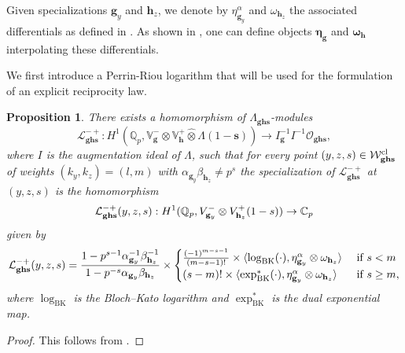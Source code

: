 \documentclass[a4paper,11pt]{amsart}
\theoremstyle{plain}
\newtheorem{propo}[theorem]{Proposition}
\theoremstyle{definition}
\theoremstyle{remark}
\newcommand{\bb}{\mathbb}
\newcommand{\cl}{\mathcal}
\DeclareMathOperator{\BK}{BK}
\DeclareMathOperator{\cyc}{cyc}
\newcommand{\hg}{{\mathbf{g}}}
\newcommand{\hh}{{\mathbf h}}
\numberwithin{equation}{section}
\begin{document}
Given specializations $\hg_y$ and $\hh_z$, we denote by $\eta_{\hg_y}^\alpha$ and $\omega_{\hh_z}$ the associated differentials as defined in \cite[\S3]{KLZ}. As shown in \cite[\S10]{KLZ}, %
one can define objects $\bm{\eta}_{\hg}$ and $\bm{\omega}_{\hh}$ interpolating these differentials.


We first introduce a Perrin-Riou logarithm that will be used for the formulation of an explicit reciprocity law. 


\begin{propo}\label{perrin1}
There exists a
homomorphism of $\Lambda_{\hg \hh \mathbf{s}}$-modules
\[
\mathcal L_{\hg \hh \mathbf{s}}^{-+}: H^1(\mathbb Q_p, \mathbb V_{\hg}^- \hat \otimes \mathbb V_{\hh}^+ \hat \otimes \Lambda(1-\mathbf{s})) \rightarrow  I_{\hg}^{-1} I^{-1}\cl{O}_{\hg \hh \mathbf{s}},
\]
where $I$ is the augmentation ideal of $\Lambda$, such that for every point $(y,z,s) \in \mathcal W_{{\bf ghs}}^{\mathrm{cl}}$ of weights $(k_y,k_z)=(l,m)$ with $\alpha_{\hg_y}\beta_{\hh_z}\neq p^s$ the specialization of $\mathcal L_{\hg \hh \mathbf{s}}^{-+}$ at $(y,z,s)$ is the homomorphism
\[
\mathcal L_{{\bf ghs}}^{-+}(y,z,s): H^1(\mathbb Q_p, V_{\hg_y}^- \otimes V_{\hh_z}^+(1-s)) \rightarrow \mathbb C_p
\]
given by
\[
\mathcal L_{{\bf ghs}}^{-+}(y,z,s) = \frac{1-p^{s-1} \alpha_{\hg_y}^{-1} \beta_{\hh_z}^{-1}}{1-p^{-s} \alpha_{\hg_y} \beta_{\hh_z}} \times \begin{cases} \frac{(-1)^{m-s-1}}{(m-s-1)!} \times \langle \log_{\BK}(\cdot), \eta_{\hg_y}^\alpha \otimes \omega_{\hh_z} \rangle & \text{ if } s < m \\ (s-m)! \times \langle \exp_{\BK}^*(\cdot), \eta_{\hg_y}^\alpha \otimes \omega_{\hh_z} \rangle & \text{ if } s \geq m, \end{cases}
\]
where $\log_{\BK}$ is the Bloch--Kato logarithm and $\exp_{\BK}^*$ is the dual exponential map.
\end{propo}
\begin{proof}
This follows from \cite[Theorem~8.2.8, Proposition~10.1.1]{KLZ}.
\end{proof}
\end{document}
